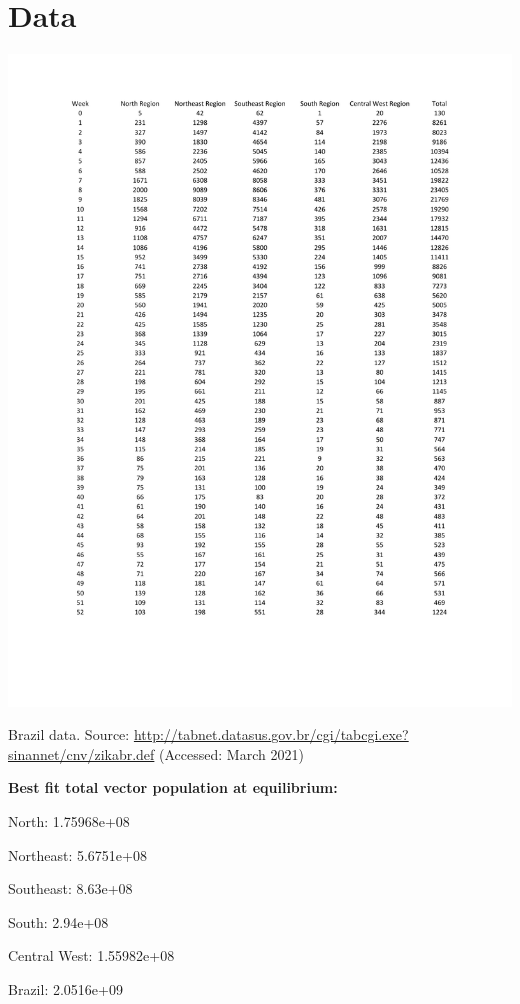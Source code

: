 \documentclass[10pt,letterpaper]{article}
\begin{document}
\nolinenumbers


\pagebreak
\appendix
\section{Data}
\begin{table}
    \centering
    \includegraphics[height = 0.85\textheight,  trim = 2cm 4cm 2cm 4cm]{Zika_PE_figs/Brazil_zika_by_region.pdf}
    \caption{Brazil data. Source: \url{http://tabnet.datasus.gov.br/cgi/tabcgi.exe?sinannet/cnv/zikabr.def} (Accessed: March 2021)}
    \label{tab:zika_data}
\end{table}

\textbf{Best fit total vector population at equilibrium:}

North: 1.75968e+08

Northeast: 5.6751e+08

Southeast: 8.63e+08

South: 2.94e+08

Central West: 1.55982e+08

Brazil: 2.0516e+09
\end{document}
